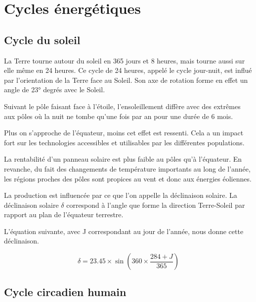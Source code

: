 \chapter{Cycles énergétiques}
\section{Cycle du soleil}

La Terre tourne autour du soleil en 365 jours et 8 heures, mais tourne aussi sur elle même en 24 heures.
Ce cycle de 24 heures, appelé le cycle jour-nuit, est influé par l'orientation de la Terre face au Soleil.
Son axe de rotation forme en effet un angle de 23° degrés avec le Soleil.

Suivant le pôle faisant face à l'étoile, l'ensoleillement diffère avec des extrêmes aux pôles où la nuit ne tombe
qu'une fois par an pour une durée de 6 mois.

Plus on s'approche de l'équateur, moins cet effet est ressenti. Cela a un impact fort sur les technologies
accessibles et utilisables par les différentes populations.

La rentabilité d'un panneau solaire est plus faible au pôles qu'à l'équateur.
En revanche, du fait des changements de température importants au long de l'année, les régions proches des pôles
sont propices au vent et donc aux énergies éoliennes.

La production est influencée par ce que l'on appelle la déclinaison solaire.
La déclinaison solaire $\delta$ correspond à l’angle que forme la direction
Terre-Soleil par rapport au plan de l’équateur terrestre.

L'équation suivante, avec J correspondant au jour de l'année, nous donne cette déclinaison.

\begin{equation}
  \delta = 23.45 \times \sin \left( 360 \times \frac{284 + J}{365} \right)
\end{equation}


\section{Cycle circadien humain}

